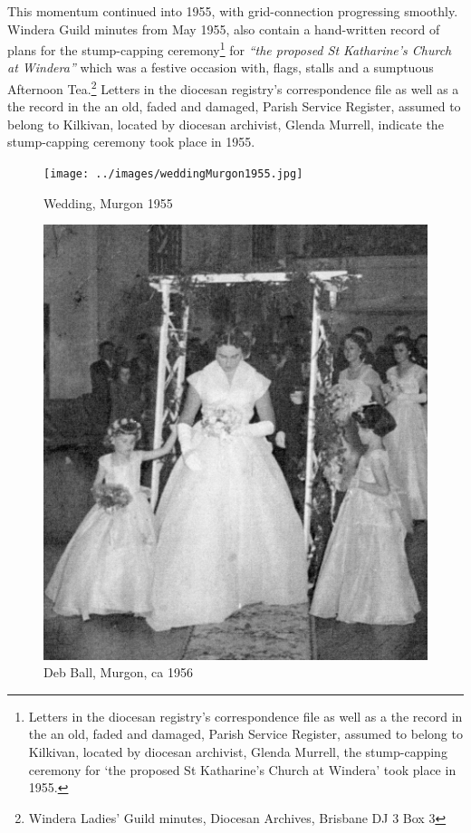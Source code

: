This momentum continued into 1955, with grid-connection progressing smoothly. Windera Guild minutes from May 1955, also contain a hand-written record of plans for the stump-capping ceremony\footnote{Letters in the diocesan registry's correspondence file as well as a the record in the an old, faded and damaged, Parish Service Register, assumed to belong to Kilkivan, located by diocesan archivist, Glenda Murrell, the stump-capping ceremony for `the proposed St Katharine's Church at Windera' took place in 1955.} for \emph{``the proposed St Katharine's Church at Windera''} which was a festive occasion with, flags, stalls and a sumptuous Afternoon Tea.\footnote{Windera Ladies' Guild minutes, Diocesan Archives, Brisbane DJ 3 Box 3} Letters in the diocesan registry's correspondence file as well as a the record in the an old, faded and damaged, Parish Service Register, assumed to belong to Kilkivan, located by diocesan archivist, Glenda Murrell, indicate the stump-capping ceremony took place in 1955.








\begin{figure}
\begin{center}
\texttt{[image: ../images/weddingMurgon1955.jpg]}
\caption{Wedding, Murgon 1955}
\end{center}
\end{figure}










\begin{figure}
\begin{center}
\includegraphics[width=.9\linewidth,center]{../images/debBallMurgon.jpg}
\caption{Deb Ball, Murgon, ca 1956}
\end{center}
\end{figure}




